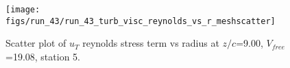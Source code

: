 \begin{figure}[H]
\centering
\texttt{[image: figs/run\_43/run\_43\_turb\_visc\_reynolds\_vs\_r\_meshscatter]}
\caption{Scatter plot of $
u_T$ reynolds stress term vs radius at $z/c$=9.00, $V_{free}$=19.08, station 5.}
\label{fig:run_43_turb_visc_reynolds_vs_r_meshscatter}
\end{figure}


